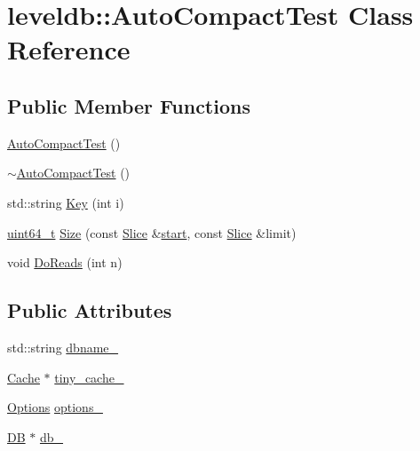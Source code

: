 \hypertarget{classleveldb_1_1_auto_compact_test}{}\section{leveldb\+:\+:Auto\+Compact\+Test Class Reference}
\label{classleveldb_1_1_auto_compact_test}
\subsection*{Public Member Functions}
\begin{DoxyCompactItemize}
\item 
\hyperlink{classleveldb_1_1_auto_compact_test_a31fe0ded855f188fac1650c70849760c}{Auto\+Compact\+Test} ()
\item 
\hyperlink{classleveldb_1_1_auto_compact_test_a671873887bb99ee3731add4298a8df0b}{$\sim$\+Auto\+Compact\+Test} ()
\item 
std\+::string \hyperlink{classleveldb_1_1_auto_compact_test_a02993bed0b92d580bb0a51b92191eba9}{Key} (int i)
\item 
\hyperlink{stdint_8h_aaa5d1cd013383c889537491c3cfd9aad}{uint64\+\_\+t} \hyperlink{classleveldb_1_1_auto_compact_test_a4be489ee1b3868f61d9976935e9b2bc4}{Size} (const \hyperlink{classleveldb_1_1_slice}{Slice} \&\hyperlink{db__bench_8cc_ab376b87f96a574a793c03c53e75afec8}{start}, const \hyperlink{classleveldb_1_1_slice}{Slice} \&limit)
\item 
void \hyperlink{classleveldb_1_1_auto_compact_test_a1d1feea1aef1257e461c35eb5b51fa52}{Do\+Reads} (int n)
\end{DoxyCompactItemize}
\subsection*{Public Attributes}
\begin{DoxyCompactItemize}
\item 
std\+::string \hyperlink{classleveldb_1_1_auto_compact_test_a9caaa257e508397f94fbe646893b7b3b}{dbname\+\_\+}
\item 
\hyperlink{classleveldb_1_1_cache}{Cache} $\ast$ \hyperlink{classleveldb_1_1_auto_compact_test_a189cb5733d861b7df8c3bf945180afe5}{tiny\+\_\+cache\+\_\+}
\item 
\hyperlink{structleveldb_1_1_options}{Options} \hyperlink{classleveldb_1_1_auto_compact_test_ad7f1f35214065627e4cadd0468d22c21}{options\+\_\+}
\item 
\hyperlink{classleveldb_1_1_d_b}{D\+B} $\ast$ \hyperlink{classleveldb_1_1_auto_compact_test_a9e8d5f9bf0546b7d7fdf2128c66d8761}{db\+\_\+}
\end{DoxyCompactItemize}


